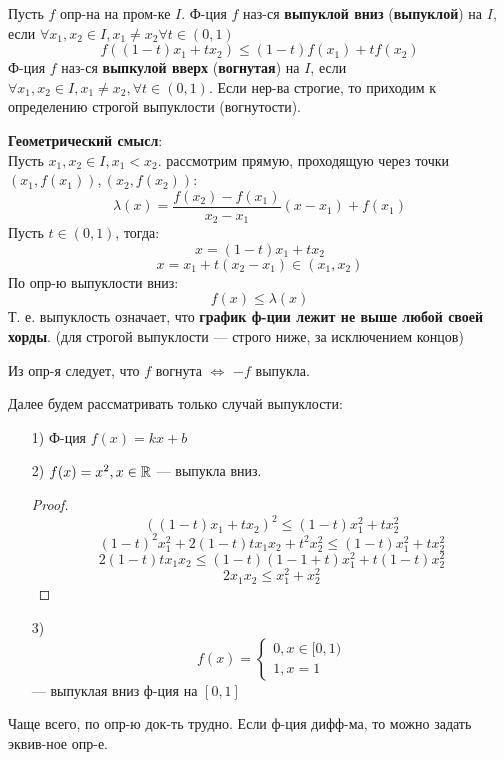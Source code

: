 \begin{definition}
Пусть $f$ опр-на на пром-ке $I$. Ф-ция $f$ наз-ся \textbf{выпуклой вниз} (\textbf{выпуклой}) на $I$, если  $\forall x_1, x_2 \in I, x_1 \neq x_2 \forall t \in (0, 1)$
\[
  f((1 - t)x_1 + tx_2) \leq (1 - t)f(x_1) + tf(x_2)
\]
Ф-ция $f$ наз-ся \textbf{выпкулой вверх} (\textbf{вогнутая}) на $I$, если $\forall x_1, x_2 \in I, x_1 \neq x_2, \forall t \in (0, 1)$. Если нер-ва строгие, то приходим к определению строгой выпуклости (вогнутости). \\
\end{definition}
\textbf{Геометрический смысл}: \\
Пусть $x_1, x_2 \in I, x_1 < x_2$. рассмотрим прямую, проходящую через точки $(x_1, f(x_1)), (x_2, f(x_2))$:
\[
\lambda(x) = \frac{f(x_2) - f(x_1)}{x_2 - x_1}(x - x_1) + f(x_1)
\]
Пусть $t \in (0, 1)$, тогда:
\[
x = (1 - t)x_1 + tx_2
\]
\[
x = x_1 + t(x_2 - x_1) \in (x_1, x_2)
\]
По опр-ю выпуклости вниз:
\[
f(x) \leq \lambda(x)
\]
Т. е. выпуклость означает, что \textbf{график ф-ции лежит не выше любой своей хорды}. (для строгой выпуклости --- строго ниже, за исключением концов) \\
\begin{note}
Из опр-я следует, что $f$ вогнута $\iff $ $-f$ выпукла.
\end{note}
Далее будем рассматривать только случай выпуклости:
\begin{example}
\begin{itemize}
  \item [1) ] Ф-ция $f(x) = kx + b$
  \item [2) ] $f(x) = x^{2}, x \in \mathbb{R}$ --- выпукла вниз.
    \begin{proof}
    \[
      ((1 - t)x_1 + tx_2)^{2} \leq (1 - t)x_1^{2} + tx_2^{2}
    \]
    \[
      (1 - t)^{2}x_1^{2} + 2(1 - t)t x_1x_2 + t^{2}x_2^{2} \leq (1 - t)x_1^{2} + tx_2^{2}
    \]
    \[
      2(1 - t)tx_1x_2 \leq (1 - t)(1 - 1 + t)x_1^{2} + t(1 - t)x_2^{2}
    \]
    \[
    2x_1x_2 \leq x_1^{2} + x_2^{2}
    \]
    \end{proof}
  \item [3) ]\[
    f(x) = \begin{cases}
    0, x \in [0, 1) \\
    1, x = 1
    \end{cases}
  \] 
  --- выпуклая вниз ф-ция на $[0, 1]$
\end{itemize}
\end{example}
\begin{note}
Чаще всего, по опр-ю док-ть трудно. Если ф-ция дифф-ма, то можно задать эквив-ное опр-е.
\end{note}
